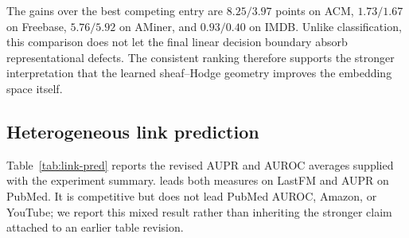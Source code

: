 The gains over the best competing entry are $8.25/3.97$ points on ACM, $1.73/1.67$ on Freebase,
$5.76/5.92$ on AMiner, and $0.93/0.40$ on IMDB. Unlike classification, this comparison does not let
the final linear decision boundary absorb representational defects. The consistent ranking therefore
supports the stronger interpretation that the learned sheaf--Hodge geometry improves the embedding
space itself.

\subsection{Heterogeneous link prediction}

Table~\ref{tab:link-pred} reports the revised AUPR and AUROC averages supplied with the experiment
summary. \method{} leads both measures on LastFM and AUPR on PubMed. It is competitive but does
not lead PubMed AUROC, Amazon, or YouTube; we report this mixed result rather than inheriting the
stronger claim attached to an earlier table revision.


